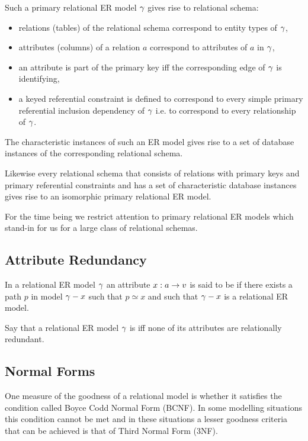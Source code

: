 Such a primary relational ER model $\gamma$ gives rise to relational schema:
\begin{itemize}
\item relations (tables) of the relational schema correspond to entity types of $\gamma$,
\item attributes (columns) of a relation $a$ correspond to attributes of $a$ in $\gamma$, 
\item an attribute is part of the primary key iff the corresponding edge of $\gamma$ is identifying,
\item a keyed referential constraint is defined to correspond to every simple primary referential inclusion dependency of $\gamma$ i.e. to correspond to every relationship of $\gamma$. 
\end{itemize}

The characteristic instances of such an ER model gives rise to a set of database instances of the corresponding relational schema.

Likewise every relational schema that consists of relations with primary keys and primary referential constraints and has a set of characteristic database instances gives rise to an isomorphic primary relational ER model. 

For the time being we restrict attention to primary relational ER models which stand-in for us for a large class of relational schemas. 

\subsection{Attribute Redundancy}
\begin{definition}
In a relational ER model $\gamma$ an attribute $x: a \rightarrow v$ is said to be  if
there exists a path $p$ in model $\gamma - x$ such that $p \simeq x$ and such that $\gamma - x$ is 
a relational ER model.  
\end{definition}
\begin{definition}
Say that a relational ER model $\gamma$ is  iff none of its attributes are relationally redundant.
\end{definition}


\subsection{Normal Forms}

\noindent One measure of the goodness of a relational model is whether it satisfies the condition called Boyce Codd Normal Form (BCNF). In some modelling situations this condition cannot be 
met and in these situations a lesser goodness criteria that can be achieved is that of Third Normal Form (3NF). 

